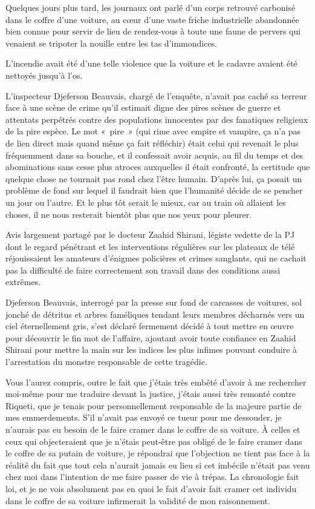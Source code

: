 Quelques jours plus tard, les journaux ont parlé d’un corps retrouvé carbonisé dans le coffre d’une voiture, au cœur d’une vaste friche industrielle abandonnée bien connue pour servir de lieu de rendez-vous à toute une faune de pervers qui venaient se tripoter la nouille entre les tas d’immondices.

L’incendie avait été d’une telle violence que la voiture et le cadavre avaient été nettoyés jusqu’à l’os.

L’inspecteur Djeferson Beauvais, chargé de l’enquête, n’avait pas caché sa terreur face à une scène de crime qu’il estimait digne des pires scènes de guerre et attentats perpétrés contre des populations innocentes par des fanatiques religieux de la pire espèce. Le mot «~pire~» (qui rime avec empire et vampire, ça n’a pas de lien direct mais quand même ça fait réfléchir) était celui qui revenait le plus fréquemment dans sa bouche, et il confessait avoir acquis, au fil du temps et des abominations sans cesse plus atroces auxquelles il était confronté, la certitude que quelque chose ne tournait pas rond chez l’être humain. D’après lui, ça posait un problème de fond sur lequel il faudrait bien que l’humanité décide de se pencher un jour ou l’autre. Et le plus tôt serait le mieux, car au train où allaient les choses, il ne nous resterait bientôt plus que nos yeux pour pleurer.

Avis largement partagé par le docteur Zaahid Shirani, légiste vedette de la PJ dont le regard pénétrant et les interventions régulières sur les plateaux de télé réjouissaient les amateurs d’énigmes policières et crimes sanglants, qui ne cachait pas la difficulté de faire correctement son travail dans des conditions aussi extrêmes.

Djeferson Beauvais, interrogé par la presse sur fond de carcasses de voitures, sol jonché de détritus et arbres faméliques tendant leurs membres décharnés vers un ciel éternellement gris, s’est déclaré fermement décidé à tout mettre en œuvre pour découvrir le fin mot de l’affaire, ajoutant avoir toute confiance en Zaahid Shirani pour mettre la main sur les indices les plus infimes pouvant conduire à l’arrestation du monstre responsable de cette tragédie.

Vous l’aurez compris, outre le fait que j’étais très embêté d’avoir à me rechercher moi-même pour me traduire devant la justice, j’étais aussi très remonté contre Riqueti, que je tenais pour personnellement responsable de la majeure partie de mes emmerdements. S’il n’avait pas envoyé ce tueur pour me dessouder, je n’aurais pas eu besoin de le faire cramer dans le coffre de sa voiture. À celles et ceux qui objecteraient que je n’étais peut-être pas obligé de le faire cramer dans le coffre de sa putain de voiture, je répondrai que l’objection ne tient pas face à la réalité du fait que tout cela n’aurait jamais eu lieu si cet imbécile n’était pas venu chez moi dans l’intention de me faire passer de vie à trépas. La chronologie fait loi, et je ne vois absolument pas en quoi le fait d’avoir fait cramer cet individu dans le coffre de sa voiture infirmerait la validité de mon raisonnement.

